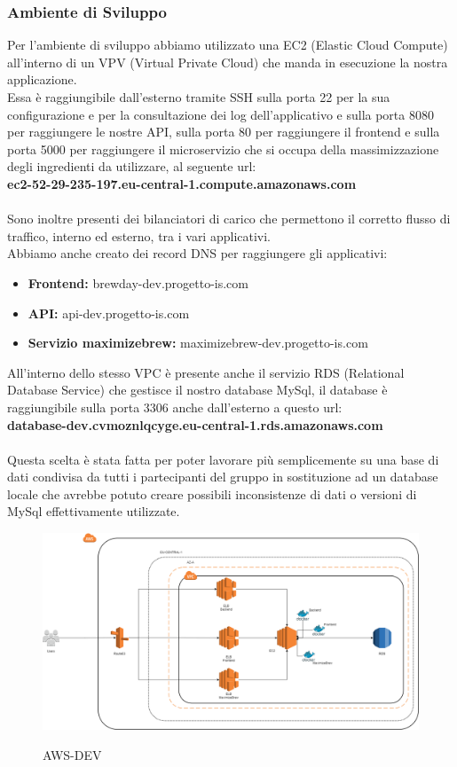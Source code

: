 \documentclass{article}
\begin{document}
\subsubsection{Ambiente di Sviluppo}
Per l’ambiente di sviluppo abbiamo utilizzato una EC2 (Elastic Cloud Compute) all’interno di un VPV (Virtual Private Cloud) che manda in esecuzione la nostra applicazione.\\
Essa è raggiungibile dall’esterno tramite SSH sulla porta 22 per la sua configurazione e per la consultazione dei log dell’applicativo e sulla porta 8080 per raggiungere le nostre API, sulla porta 80 per raggiungere il frontend e sulla porta 5000 per raggiungere il microservizio che si occupa della massimizzazione degli ingredienti da utilizzare, al seguente url: \\ \textbf{ec2-52-29-235-197.eu-central-1.compute.amazonaws.com}\\
\\
Sono inoltre presenti dei bilanciatori di carico che permettono il corretto flusso di traffico, interno ed esterno, tra i vari applicativi.\\
Abbiamo anche creato dei record DNS per raggiungere gli applicativi:\\
\begin{itemize}
    \item \textbf{Frontend:} brewday-dev.progetto-is.com\\
    \item \textbf{API:} api-dev.progetto-is.com\\
    \item \textbf{Servizio maximizebrew:} maximizebrew-dev.progetto-is.com\\
\end{itemize}
All’interno dello stesso VPC è presente anche il servizio RDS (Relational Database Service) che gestisce il nostro database MySql, il database è raggiungibile sulla porta 3306 anche dall’esterno a questo url:\\ \textbf{database-dev.cvmoznlqcyge.eu-central-1.rds.amazonaws.com}\\
\\
Questa scelta è stata fatta per poter lavorare più semplicemente su una base di dati condivisa da tutti i partecipanti del gruppo in sostituzione ad un database locale che avrebbe potuto creare possibili inconsistenze di dati o versioni di MySql effettivamente utilizzate.
\begin{figure}[h!]
\centering
\includegraphics[scale=0.3]{AWS-DEV.png}
\label{fig:AWS-DEV}
\caption{AWS-DEV}
\end{figure}
\end{document}
